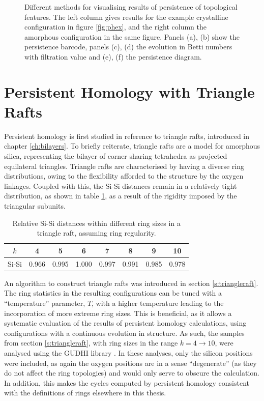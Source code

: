 \begin{figure}[tbp]
	\caption{Different methods for visualising results of persistence of topological features. The left column gives results for the example crystalline configuration in figure \ref{fig:phex}, and the right column the amorphous configuration in the same figure. Panels (a), (b) show the persistence barcode, panels (c), (d) the evolution in Betti numbers with filtration value and (e), (f) the persistence diagram.}
	\label{fig:exvis}
\end{figure}

\section{Persistent Homology with Triangle Rafts}

Persistent homology is first studied in reference to triangle rafts, introduced in chapter \ref{ch:bilayers}.
To briefly reiterate, triangle rafts are a model for \td{} amorphous silica, representing the bilayer of corner sharing tetrahedra as projected equilateral triangles.
Triangle rafts are characterised by having a diverse ring distributions, owing to the flexibility afforded to the structure by the oxygen linkages.
Coupled with this, the Si\--Si distances remain in a relatively tight distribution, as shown in table \ref{tab:trsidist}, as a result of the rigidity imposed by the triangular subunits.

\begin{table}[hbt]
\centering
\caption{Relative Si\--Si distances within different ring sizes in a triangle raft, assuming ring regularity.}
\label{tab:trsidist}
\begin{tabular}{cccccccc}
\toprule
$k$ & 4 & 5 & 6 & 7 & 8 & 9 & 10 \\
\midrule
Si\--Si & 0.966 & 0.995 & 1.000 & 0.997 & 0.991 & 0.985 & 0.978 \\
\bottomrule
\end{tabular}
\end{table}

An algorithm to construct triangle rafts was introduced in section \ref{s:triangleraft}.
The ring statistics in the resulting configurations can be tuned with a ``temperature'' parameter, $T$, with a higher temperature leading to the incorporation of more extreme ring sizes.
This is beneficial, as it allows a systematic evaluation of the results of persistent homology calculations, using configurations with a continuous evolution in structure.
As such, the samples from section \ref{s:triangleraft}, with ring sizes in the range $k=4\rightarrow10$, were analysed using the GUDHI library \cite{gudhi}.
In these analyses, only the silicon positions were included, as again the oxygen positions are in a sense ``degenerate'' (as they do not affect the ring topologies) and would only serve to obscure the calculation.
In addition, this makes the cycles computed by persistent homology consistent with the definitions of rings elsewhere in this thesis.

